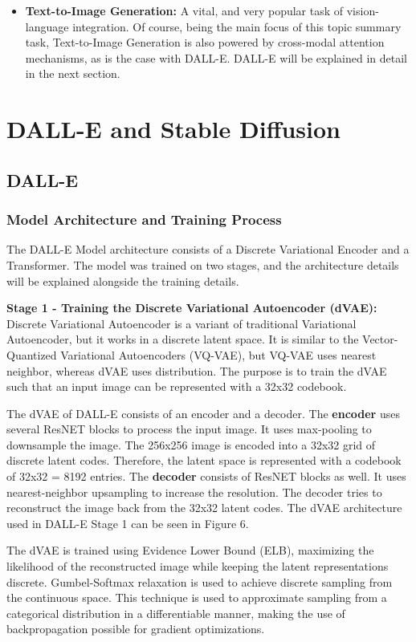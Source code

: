 \documentclass{article}
\begin{document}
\begin{itemize}
    \item \textbf{Text-to-Image Generation:} A vital, and very popular task of vision-language integration. Of course, being the main focus of this topic summary task, Text-to-Image Generation is also powered by cross-modal attention mechanisms, as is the case with DALL-E. DALL-E will be explained in detail in the next section. 
\end{itemize}

\section{DALL-E and Stable Diffusion}

\subsection{DALL-E}
\subsubsection{Model Architecture and Training Process}
The DALL-E Model architecture consists of a Discrete Variational Encoder and a Transformer. The model was trained on two stages, and the architecture details will be explained alongside the training details.

\item \textbf{Stage 1 - Training the Discrete Variational Autoencoder (dVAE):} Discrete Variational Autoencoder is a variant of traditional Variational Autoencoder, but it works in a discrete latent space. It is similar to the Vector-Quantized Variational Autoencoders (VQ-VAE), but VQ-VAE uses nearest neighbor, whereas dVAE uses distribution. The purpose is to train the dVAE such that an input image can be represented with a 32x32 codebook. 

The dVAE of DALL-E consists of an encoder and a decoder. The \textbf{encoder} uses several ResNET blocks to process the input image. It uses max-pooling to downsample the image. The 256x256 image is encoded into a 32x32 grid of discrete latent codes. Therefore, the latent space is represented with a codebook of 32x32 = 8192 entries. The \textbf{decoder} consists of ResNET blocks as well. It uses nearest-neighbor upsampling to increase the resolution. The decoder tries to reconstruct the image back from the 32x32 latent codes. The dVAE architecture used in DALL-E Stage 1 can be seen in Figure 6.

The dVAE is trained using Evidence Lower Bound (ELB), maximizing the likelihood of the reconstructed image while keeping the latent representations discrete. Gumbel-Softmax relaxation is used to achieve discrete sampling from the continuous space. This technique is used to approximate sampling from a categorical distribution in a differentiable manner, making the use of backpropagation possible for gradient optimizations.
\end{document}
